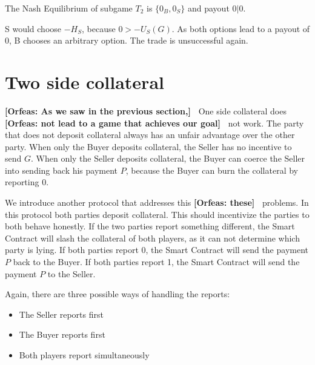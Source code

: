 \documentclass{cacthesis}
\newcommand{\authnote}[3]{{ \footnotesize \textbf{#1[#2: #3]~}}}
\newcommand{\orfnote}[1]{\authnote{\color{blue}}{Orfeas}{#1}}
\begin{document}
The Nash Equilibrium of subgame $T_2$ is $\{0_B, 0_S\}$ and payout $0 | 0$. \newline

S would choose $-H_S$, because $0>-U_S(G)$.\newline
As both options lead to a payout of 0, B chooses an arbitrary option. The trade is unsuccessful again.


\section{Two side collateral}
\orfnote{As we saw in the previous section,} One side collateral does
\orfnote{not lead to a game that achieves our goal} not work. The party that does not deposit collateral always has an unfair advantage over the other party. \newline
When only the Buyer deposits collateral, the Seller has no incentive to send $G$. \newline
When only the Seller deposits collateral, the Buyer can coerce the Seller into sending back his payment $P$, because the Buyer can burn the collateral by reporting 0.\newline 

We introduce another protocol that addresses this \orfnote{these} problems. In this protocol both parties deposit collateral. This should incentivize the parties to both behave honestly.\newline
If the two parties report something different, the Smart Contract will slash the collateral of both players, as it can not determine which party is lying. If both parties report 0, the Smart Contract will send the payment $P$ back to the Buyer. If both parties report 1, the Smart Contract will send the payment $P$ to the Seller.  \newline

Again, there are three possible ways of handling the reports:
\begin{itemize}
    \item The Seller reports first
    \item The Buyer reports first
    \item Both players report simultaneously
\end{itemize}
\end{document}
